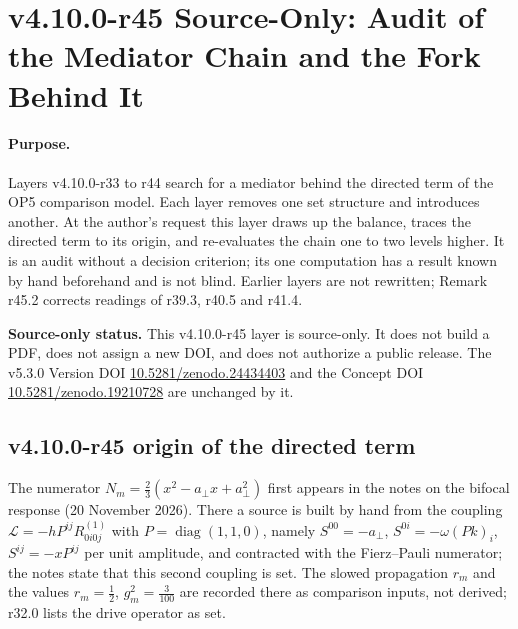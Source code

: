 \clearpage
\section*{v4.10.0-r45 Source-Only: Audit of the Mediator Chain and the Fork Behind It}
\label{sec:v4100-r45-mediator-audit}

\paragraph{Purpose.}
Layers v4.10.0-r33 to r44 search for a mediator behind the directed term of the OP5 comparison model.  Each layer removes one set structure
and introduces another.  At the author's request this layer draws up the balance, traces the directed term to its origin, and re-evaluates the
chain one to two levels higher.  It is an audit without a decision criterion; its one computation has a result known by hand beforehand and
is not blind.  Earlier layers are not rewritten; Remark r45.2 corrects readings of r39.3, r40.5 and r41.4.

\noindent\textbf{Source-only status.}
This v4.10.0-r45 layer is source-only.  It does not build a PDF, does not assign a new DOI,
and does not authorize a public release.  The v5.3.0 Version DOI
\href{https://doi.org/10.5281/zenodo.24434403}{10.5281/zenodo.24434403} and the Concept DOI
\href{https://doi.org/10.5281/zenodo.19210728}{10.5281/zenodo.19210728} are unchanged by it.

\subsection*{v4.10.0-r45 origin of the directed term}
\label{subsec:v4100-r45-origin}

The numerator \(N_m=\tfrac23(x^2-a_\perp x+a_\perp^2)\) first appears in the notes on the bifocal response (20 November 2026).  There a source is built by
hand from the coupling \(\mathcal L=-hP^{ij}R^{(1)}_{0i0j}\) with \(P=\operatorname{diag}(1,1,0)\), namely \(S^{00}=-a_\perp\), \(S^{0i}=-\omega(Pk)_i\), \(S^{ij}=-xP^{ij}\) per unit
amplitude, and contracted with the Fierz--Pauli numerator; the notes state that this second coupling is set.  The slowed propagation \(r_m\) and the
values \(r_m=\tfrac12\), \(g_m^2=\tfrac3{100}\) are recorded there as comparison inputs, not derived; r32.0 lists the drive operator as set.

